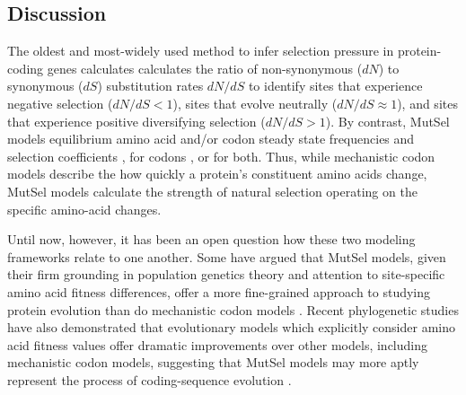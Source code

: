 \documentclass[11pt]{article}
\begin{document}
\subsection*{Discussion}




The oldest and most-widely used method to infer selection pressure in protein-coding genes calculates calculates the ratio of non-synonymous ($dN$) to synonymous ($dS$) substitution rates $dN/dS$ to identify sites that experience negative selection ($dN/dS<1$), sites that evolve neutrally ($dN/dS\approx1$), and sites that experience positive diversifying selection ($dN/dS>1$). By contrast, MutSel models equilibrium amino acid and/or codon steady state frequencies and selection coefficients \cite{HalpernBruno1998,NielsenYang2008,Rodrigueetal2010,Tamurietal2012,Tamurietal2014}, for codons \cite{YangNielsen2008}, or for both. Thus, while mechanistic codon models describe the how quickly a protein's constituent amino acids change, MutSel models calculate the strength of natural selection operating on the specific amino-acid changes.  

Until now, however, it has been an open question how these two modeling frameworks relate to one another. Some have argued that MutSel models, given their firm grounding in population genetics theory and attention to site-specific amino acid fitness differences, offer a more fine-grained approach to studying protein evolution than do mechanistic codon models \cite{HalpernBruno1998,Rodrigueetal2010}. Recent phylogenetic studies have also demonstrated that evolutionary models which explicitly consider amino acid fitness values offer dramatic improvements over other models, including mechanistic codon models, suggesting that MutSel models may more aptly represent the process of coding-sequence evolution \cite{Bloom2014a, Bloom2014b}. 
\end{document}
